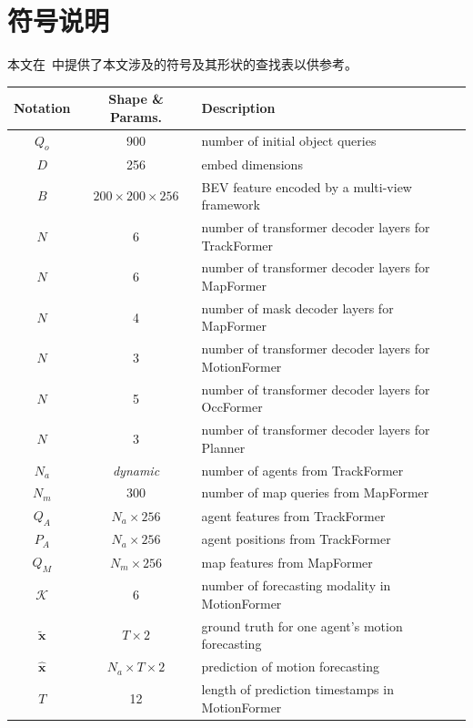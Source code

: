 \documentclass[10pt,twocolumn,letterpaper]{article}
\begin{document}
\section{符号说明}
\label{sec:notations}
本文在~中提供了本文涉及的符号及其形状的查找表以供参考。
\begin{table}%
	\begin{center}
			\begin{tabular}{ccl}
				\toprule
				Notation & Shape \& Params. & Description \\
				\midrule
				$Q_o$ & 900 & number of initial object queries \\
				$D$ & 256 & embed dimensions \\
				$B$ & $200 \times 200 \times 256$ &BEV feature encoded by a multi-view framework \\
				$N$ & 6 &number of transformer decoder layers for TrackFormer \\
				$N$ & 6 &number of transformer decoder layers for MapFormer \\
				$N$ & 4 &number of mask decoder layers for MapFormer \\
				$N$ & 3 &number of transformer decoder layers for MotionFormer \\
				$N$ & 5 &number of transformer decoder layers for OccFormer \\
				$N$ & 3 &number of transformer decoder layers for Planner \\
				$N_a$ & \textit{dynamic} &number of agents from TrackFormer \\
				$N_m$ & 300 &number of map queries from MapFormer \\
				$Q_A$ & $N_{a} \times 256$ &agent features from TrackFormer \\
				$P_A$ & $N_{a} \times 256$ &agent positions from TrackFormer \\
				$Q_M$ & $N_{m} \times 256$ &map features from MapFormer \\
				$\mathcal{K}$ & 6 & number of forecasting modality in MotionFormer \\
				$\tilde{\mathbf{x}}$ & $T \times 2$ & ground truth for one agent's motion forecasting \\
				$\hat{\mathbf{x}}$ & $N_{a} \times T \times 2$& prediction of motion forecasting \\
				$T$ & 12 &length of prediction timestamps in MotionFormer \\

\end{tabular}
\end{center}
\end{table}
\end{document}
